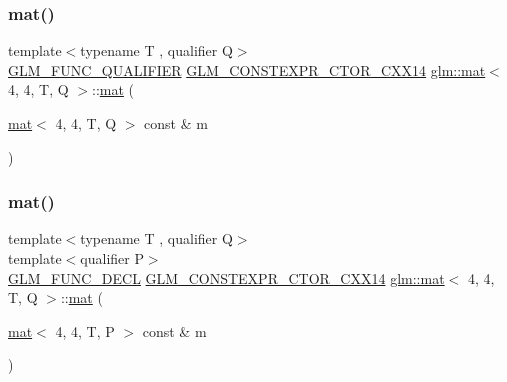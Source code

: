 \subsubsection{\texorpdfstring{mat()}{mat()}\hspace{0.1cm}{\footnotesize\ttfamily [2/21]}}
{\footnotesize\ttfamily template$<$typename T , qualifier Q$>$ \\
\hyperlink{setup_8hpp_a33fdea6f91c5f834105f7415e2a64407}{G\+L\+M\+\_\+\+F\+U\+N\+C\+\_\+\+Q\+U\+A\+L\+I\+F\+I\+ER} \hyperlink{setup_8hpp_a0900f9145e68bf6061b6f5e7be3fa751}{G\+L\+M\+\_\+\+C\+O\+N\+S\+T\+E\+X\+P\+R\+\_\+\+C\+T\+O\+R\+\_\+\+C\+X\+X14} \hyperlink{structglm_1_1mat}{glm\+::mat}$<$ 4, 4, T, Q $>$\+::\hyperlink{structglm_1_1mat}{mat} (\begin{DoxyParamCaption}\item[{\hyperlink{structglm_1_1mat}{mat}$<$ 4, 4, T, Q $>$ const \&}]{m }\end{DoxyParamCaption})}

\mbox{\label{structglm_1_1mat_3_014_00_014_00_01_t_00_01_q_01_4_a9bb105cf95abdde89031315e39bcbe9a}} 
\subsubsection{\texorpdfstring{mat()}{mat()}\hspace{0.1cm}{\footnotesize\ttfamily [3/21]}}
{\footnotesize\ttfamily template$<$typename T , qualifier Q$>$ \\
template$<$qualifier P$>$ \\
\hyperlink{setup_8hpp_ab2d052de21a70539923e9bcbf6e83a51}{G\+L\+M\+\_\+\+F\+U\+N\+C\+\_\+\+D\+E\+CL} \hyperlink{setup_8hpp_a0900f9145e68bf6061b6f5e7be3fa751}{G\+L\+M\+\_\+\+C\+O\+N\+S\+T\+E\+X\+P\+R\+\_\+\+C\+T\+O\+R\+\_\+\+C\+X\+X14} \hyperlink{structglm_1_1mat}{glm\+::mat}$<$ 4, 4, T, Q $>$\+::\hyperlink{structglm_1_1mat}{mat} (\begin{DoxyParamCaption}\item[{\hyperlink{structglm_1_1mat}{mat}$<$ 4, 4, T, P $>$ const \&}]{m }\end{DoxyParamCaption})}

\mbox{\label{structglm_1_1mat_3_014_00_014_00_01_t_00_01_q_01_4_a120c0dcb0ff63f8c2581bec91de7c0bb}} 
